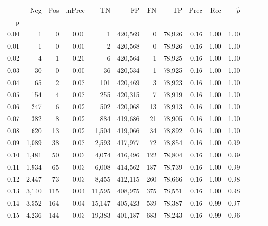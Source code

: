 \begin{tabular}{rrrrrrrrrrrrrr}
\toprule
{} &    Neg &    Pos & mPrec &       TN &       FP &      FN &      TP &  Prec &   Rec & $\hat{p}$ \\
p    &        &        &       &          &          &         &         &       &       &           \\
\midrule
0.00 &      1 &      0 &  0.00 &        1 &  420,569 &       0 &  78,926 &  0.16 &  1.00 &      1.00 \\
0.01 &      1 &      0 &  0.00 &        2 &  420,568 &       0 &  78,926 &  0.16 &  1.00 &      1.00 \\
0.02 &      4 &      1 &  0.20 &        6 &  420,564 &       1 &  78,925 &  0.16 &  1.00 &      1.00 \\
0.03 &     30 &      0 &  0.00 &       36 &  420,534 &       1 &  78,925 &  0.16 &  1.00 &      1.00 \\
0.04 &     65 &      2 &  0.03 &      101 &  420,469 &       3 &  78,923 &  0.16 &  1.00 &      1.00 \\
0.05 &    154 &      4 &  0.03 &      255 &  420,315 &       7 &  78,919 &  0.16 &  1.00 &      1.00 \\
0.06 &    247 &      6 &  0.02 &      502 &  420,068 &      13 &  78,913 &  0.16 &  1.00 &      1.00 \\
0.07 &    382 &      8 &  0.02 &      884 &  419,686 &      21 &  78,905 &  0.16 &  1.00 &      1.00 \\
0.08 &    620 &     13 &  0.02 &    1,504 &  419,066 &      34 &  78,892 &  0.16 &  1.00 &      1.00 \\
0.09 &  1,089 &     38 &  0.03 &    2,593 &  417,977 &      72 &  78,854 &  0.16 &  1.00 &      0.99 \\
0.10 &  1,481 &     50 &  0.03 &    4,074 &  416,496 &     122 &  78,804 &  0.16 &  1.00 &      0.99 \\
0.11 &  1,934 &     65 &  0.03 &    6,008 &  414,562 &     187 &  78,739 &  0.16 &  1.00 &      0.99 \\
0.12 &  2,447 &     73 &  0.03 &    8,455 &  412,115 &     260 &  78,666 &  0.16 &  1.00 &      0.98 \\
0.13 &  3,140 &    115 &  0.04 &   11,595 &  408,975 &     375 &  78,551 &  0.16 &  1.00 &      0.98 \\
0.14 &  3,552 &    164 &  0.04 &   15,147 &  405,423 &     539 &  78,387 &  0.16 &  0.99 &      0.97 \\
0.15 &  4,236 &    144 &  0.03 &   19,383 &  401,187 &     683 &  78,243 &  0.16 &  0.99 &      0.96 \\

\end{tabular}
